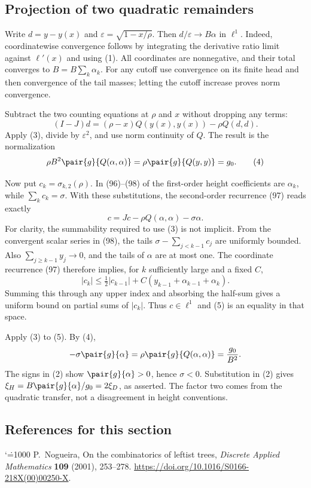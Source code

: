 \documentclass[11pt,a4paper]{article}
\makeatletter
\numberwithin{equation}{section}
\theoremstyle{definition}
\theoremstyle{remark}
\renewenvironment{thebibliography}[1]
 {\subsection*{References for this section}\small
  \list{\@biblabel{\@arabic\c@enumiv}}
       {\settowidth\labelwidth{\@biblabel{#1}}\leftmargin\labelwidth
        \advance\leftmargin\labelsep\@openbib@code
        \usecounter{enumiv}\let\p@enumiv\@empty
        \renewcommand\theenumiv{\@arabic\c@enumiv}}
  \sloppy\clubpenalty4000\widowpenalty4000\sfcode`\.=1000\relax}
 {\def\@noitemerr{\@latex@warning{Empty bibliography}}\endlist}
\makeatother
\begin{document}
\subsection{Projection of two quadratic remainders}
Write $d=y-y(x)$ and $\varepsilon=\sqrt{1-x/\rho}$. Then $d/\varepsilon\to B\alpha$ in $\ell^1$. Indeed, coordinatewise convergence follows by integrating the derivative ratio limit against $\ell'(x)$ and using (1). All coordinates are nonnegative, and their total converges to $B=B\sum_k\alpha_k$. For any cutoff use convergence on its finite head and then convergence of the tail masses; letting the cutoff increase proves norm convergence.

Subtract the two counting equations at $\rho$ and $x$ without dropping any terms:
\[
 (I-J)d=(\rho-x)Q(y(x),y(x))-\rho Q(d,d).
\]
Apply (3), divide by $\varepsilon^2$, and use norm continuity of $Q$. The result is the normalization
\[
 \rho B^2\pair{g}{Q(\alpha,\alpha)}
   =\rho\pair{g}{Q(y,y)}=g_0 .
 \tag{4}
\]

Now put $c_k=\sigma_{k,2}(\rho)$. In (96)--(98) of \cite{r49taisho:N} the first-order height coefficients are $\alpha_k$, while $\sum_kc_k=\sigma$. With these substitutions, the second-order recurrence (97) reads exactly
\[
 c=Jc-\rho Q(\alpha,\alpha)-\sigma\alpha .
 \tag{5}
\]
For clarity, the summability required to use (3) is not implicit. From the convergent scalar series in (98), the tails $\sigma-\sum_{j<k-1}c_j$ are uniformly bounded. Also $\sum_{j\ge k-1}y_j\to0$, and the tails of $\alpha$ are at most one. The coordinate recurrence (97) therefore implies, for $k$ sufficiently large and a fixed $C$,
\[
 |c_k|\le \tfrac12|c_{k-1}|+
 C(y_{k-1}+\alpha_{k-1}+\alpha_k).
\]
Summing this through any upper index and absorbing the half-sum gives a uniform bound on partial sums of $|c_k|$. Thus $c\in\ell^1$ and (5) is an equality in that space.

Apply (3) to (5). By (4),
\[
 -\sigma\pair{g}{\alpha}
    =\rho\pair{g}{Q(\alpha,\alpha)}
    =\frac{g_0}{B^2}.
\]
The signs in (2) show $\pair{g}{\alpha}>0$, hence $\sigma<0$. Substitution in (2) gives $\xi_H=B\pair{g}{\alpha}/g_0=2\xi_D$, as asserted. The factor two comes from the quadratic transfer, not a disagreement in height conventions.

\begin{thebibliography}{9}
 P.~Nogueira, On the combinatorics of leftist trees, \emph{Discrete Applied Mathematics} {\bf109} (2001), 253--278.
\url{https://doi.org/10.1016/S0166-218X(00)00250-X}.
\end{thebibliography}
\end{document}
